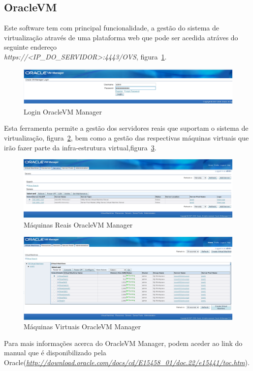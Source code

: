 \subsection{OracleVM}

Este software tem com principal funcionalidade, a gestão do sistema de virtualização através
de uma plataforma web que pode ser acedida atráves do seguinte endereço\\
\emph{https://<IP\_DO\_SERVIDOR>:4443/OVS}, figura~\ref{fig:ovm1}.

\begin{figure}[H]
    \begin{center}
        \includegraphics[width=15cm]{include/img/ovm1.png}
    \end{center}
    \caption{Login OracleVM Manager}
    \label{fig:ovm1}
\end{figure}

Esta ferramenta permite a gestão dos servidores reais que suportam o sistema de virtualização,
figura~\ref{fig:ovm2}, bem como a gestão das respectivas máquinas virtuais que irão fazer
parte da infra-estrutura virtual,figura~\ref{fig:ovm3}.

\begin{figure}[H]
    \begin{center}
        \includegraphics[width=15cm]{include/img/ovm2.png}
    \end{center}
    \caption{Máquinas Reais OracleVM Manager}
    \label{fig:ovm2}
\end{figure}



\begin{figure}[H]
    \begin{center}
        \includegraphics[width=15cm]{include/img/ovm3.png}
    \end{center}
    \caption{Máquinas Virtuais OracleVM Manager}
    \label{fig:ovm3}
\end{figure}

Para mais informações acerca do OracleVM Manager, podem aceder ao link do manual que é disponibilizado pela
Oracle(\emph{\url{http://download.oracle.com/docs/cd/E15458\_01/doc.22/e15441/toc.htm}}).
